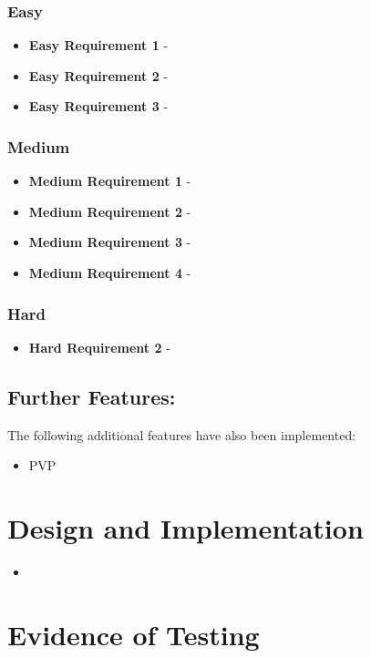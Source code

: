 \documentclass[11]{article}
\begin{document}
	 	\subsubsection{Easy}
			\begin{itemize}
				\item \textbf{Easy Requirement 1} - 
				\item \textbf{Easy Requirement 2} - 
				\item \textbf{Easy Requirement 3} - 
			\end{itemize}

		\subsubsection{Medium}
			\begin{itemize}
				\item \textbf{Medium Requirement 1} - 
				\item \textbf{Medium Requirement 2} - 
				\item \textbf{Medium Requirement 3} - 
				\item \textbf{Medium Requirement 4} -
			\end{itemize}
		\subsubsection{Hard}
				\begin{itemize}
					\item \textbf{Hard Requirement 2} - 
				\end{itemize}
	\subsection{Further Features:}
		The following additional features have also been implemented:
		\begin{itemize}
			\item PVP
		\end{itemize}

	\section{Design and Implementation}
		\begin{itemize}
				\item
		\end{itemize}
		
	\section{Evidence of Testing}	
		
\end{document}
